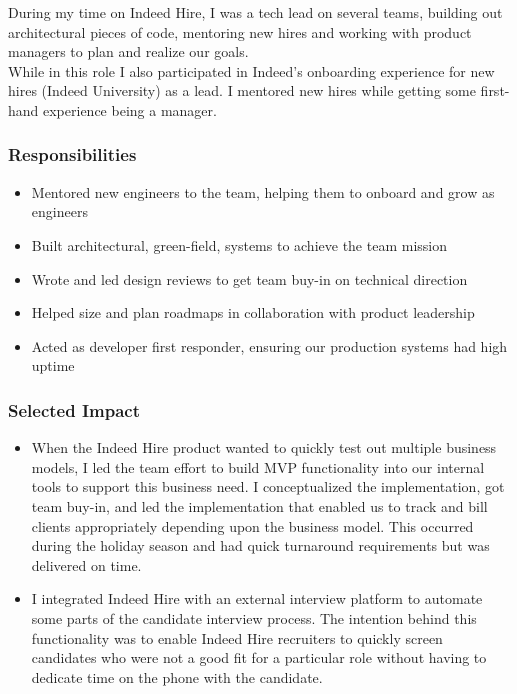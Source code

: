 \documentclass[11pt]{amsart}
\begin{document}
% 
%
\begin{tcolorbox}[
	title=Senior Software Engineer \textcolor{DarkGray}{/} Indeed,
	after title={\hfill2017 \textcolor{DarkGray}{$\rightarrow$} 2019 \textcolor{DarkGray}{(2 years)}}
]

During my time on Indeed Hire, I was a tech lead on several teams, building out architectural pieces of code, mentoring new hires and working with product managers to plan and realize our goals. \\

While in this role I also participated in Indeed's onboarding experience for new hires (Indeed University) as a lead. I mentored new hires while getting some first-hand experience being a manager.

\subsubsection{Responsibilities}

\begin{itemize}[noitemsep, leftmargin=2em, label=\raisebox{0.25ex}{\tiny$\bullet$}]
	\item Mentored new engineers to the team, helping them to onboard and grow as engineers
	\item Built architectural, green-field, systems to achieve the team mission 
	\item Wrote and led design reviews to get team buy-in on technical direction
	\item Helped size and plan roadmaps in collaboration with product leadership
	\item Acted as developer first responder, ensuring our production systems had high uptime
\end{itemize}

\subsubsection{Selected Impact}

\begin{itemize}[noitemsep, leftmargin=2em, label=\raisebox{0.25ex}{\tiny$\bullet$}]
	\item When the Indeed Hire product wanted to quickly test out multiple business models, I led the team effort to build MVP functionality into our internal tools to support this business need. I conceptualized the implementation, got team buy-in, and led the implementation that enabled us to track and bill clients appropriately depending upon the business model. This occurred during the holiday season and had quick turnaround requirements but was delivered on time.
	\item I integrated Indeed Hire with an external interview platform to automate some parts of the candidate interview process. The intention behind this functionality was to enable Indeed Hire recruiters to quickly screen candidates who were not a good fit for a particular role without having to dedicate time on the phone with the candidate. 
\end{itemize}

\end{tcolorbox}
\end{document}
